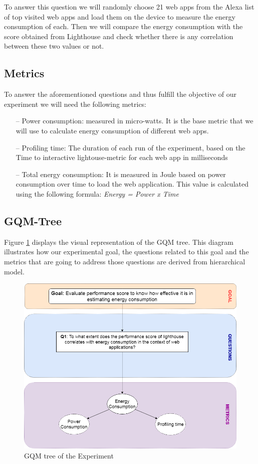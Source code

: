 To answer this question we will randomly choose 21 web apps from the Alexa list of top visited web apps and load them on the device to measure the energy consumption of each\cite{Web:Alexa}. Then we will compare the energy consumption with the score obtained from Lighthouse and check whether there is any correlation between these two values or not.
\newline

\subsection{Metrics}

To answer the aforementioned questions and thus fulfill the objective of our experiment we will need the following metrics:
\newline

\begin{itemize}
	\item[--] Power consumption: measured in micro-watts.  It is the base metric that we will use to calculate energy consumption of different web apps.
   \item[--] Profiling time: The duration of each run of the experiment, based on the Time to interactive lightouse-metric for each web app in milliseconds
   	\item[--] Total energy consumption: It is measured in Joule based on power consumption over time to load the web application. This value is calculated using the following formula:
   	 \textit{Energy = Power x Time}   
   	 \newline
\end{itemize}


\subsection{GQM-Tree}

Figure \ref{fig:GQM} displays the visual representation of the GQM tree. This diagram illustrates how our experimental goal, the questions related to this goal and the metrics that are going to address those questions are derived from hierarchical model.
\newline

\begin{figure}[H]
  \includegraphics[width=\linewidth]{./Images/GQM.png}
  \caption{GQM tree of the Experiment}
  \label{fig:GQM}
\end{figure}



